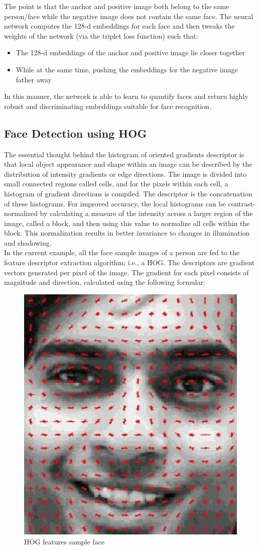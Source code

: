     The point is that the anchor and positive image both belong to the same person/face while the negative image does not contain the same face. The neural network computes the 128-d 
    embeddings for each face and then tweaks the weights of the network (via the triplet loss function) such that:
    \begin{itemize}
        \item The 128-d embeddings of the anchor and positive image lie closer together
        \item While at the same time, pushing the embeddings for the negative image father away
    \end{itemize}
    In this manner, the network is able to learn to quantify faces and return highly robust and discriminating embeddings suitable for face recognition.
    \subsection{Face Detection using HOG}
        The essential thought behind the histogram of oriented gradients descriptor is that local object appearance and shape within an image can be described by the distribution of intensity gradients or edge directions. 
        The image is divided into small connected regions called cells, and for the pixels within each cell, a histogram of gradient directions is compiled. The descriptor is the concatenation of these histograms. For 
        improved accuracy, the local histograms can be contrast-normalized by calculating a measure of the intensity across a larger region of the image, called a block, and then using this value to normalize all cells 
        within the block. This normalization results in better invariance to changes in illumination and shadowing. \\
        \vspace{3mm}
        In the current example, all the face sample images of a person are fed to the feature descriptor extraction algorithm; i.e., a HOG. The descriptors are gradient vectors generated per pixel of the image. 
        The gradient for each pixel consists of magnitude and direction, calculated using the following formular:
        \begin{figure}[H]
            \centering
            \includegraphics[width=0.6\linewidth]{img/HOG-feature.jpg}
            \caption{HOG features sample face}
        \end{figure}
